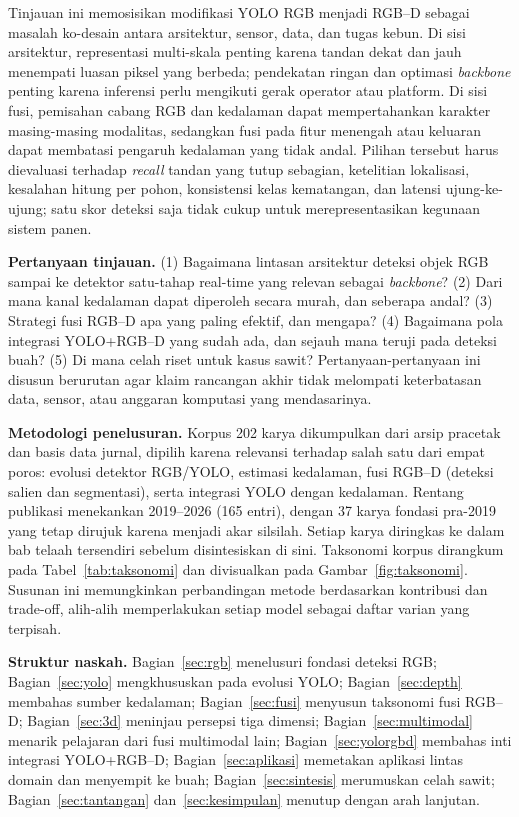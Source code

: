 Tinjauan ini memosisikan modifikasi YOLO RGB menjadi RGB--D sebagai masalah
ko-desain antara arsitektur, sensor, data, dan tugas kebun. Di sisi
arsitektur, representasi multi-skala penting karena tandan dekat dan jauh
menempati luasan piksel yang berbeda; pendekatan ringan dan optimasi
\textit{backbone} penting karena inferensi perlu mengikuti gerak operator
atau platform. Di sisi fusi, pemisahan cabang RGB dan kedalaman dapat
mempertahankan karakter masing-masing modalitas, sedangkan fusi pada fitur
menengah atau keluaran dapat membatasi pengaruh kedalaman yang tidak andal.
Pilihan tersebut harus dievaluasi terhadap \textit{recall} tandan yang
tutup sebagian, ketelitian lokalisasi, kesalahan hitung per pohon, konsistensi
kelas kematangan, dan latensi ujung-ke-ujung; satu skor deteksi saja tidak
cukup untuk merepresentasikan kegunaan sistem panen.

\textbf{Pertanyaan tinjauan.} (1) Bagaimana lintasan arsitektur deteksi
objek RGB sampai ke detektor satu-tahap real-time yang relevan sebagai
\textit{backbone}? (2) Dari mana kanal kedalaman dapat diperoleh secara
murah, dan seberapa andal? (3) Strategi fusi RGB--D apa yang paling
efektif, dan mengapa? (4) Bagaimana pola integrasi YOLO+RGB--D yang
sudah ada, dan sejauh mana teruji pada deteksi buah? (5) Di mana celah
riset untuk kasus sawit? Pertanyaan-pertanyaan ini disusun berurutan agar
klaim rancangan akhir tidak melompati keterbatasan data, sensor, atau
anggaran komputasi yang mendasarinya.

\textbf{Metodologi penelusuran.} Korpus 202 karya dikumpulkan dari
arsip pracetak dan basis data jurnal, dipilih karena relevansi terhadap
salah satu dari empat poros: evolusi detektor RGB/YOLO, estimasi
kedalaman, fusi RGB--D (deteksi salien dan segmentasi), serta integrasi
YOLO dengan kedalaman. Rentang publikasi menekankan 2019--2026 (165
entri), dengan 37 karya fondasi pra-2019 yang tetap dirujuk karena
menjadi akar silsilah. Setiap karya diringkas ke dalam bab telaah
tersendiri sebelum disintesiskan di sini. Taksonomi korpus dirangkum
pada Tabel~\ref{tab:taksonomi} dan divisualkan pada
Gambar~\ref{fig:taksonomi}. Susunan ini memungkinkan perbandingan metode
berdasarkan kontribusi dan trade-off, alih-alih memperlakukan setiap model
sebagai daftar varian yang terpisah.

\textbf{Struktur naskah.} Bagian~\ref{sec:rgb} menelusuri fondasi
deteksi RGB; Bagian~\ref{sec:yolo} mengkhususkan pada evolusi YOLO;
Bagian~\ref{sec:depth} membahas sumber kedalaman; Bagian~\ref{sec:fusi}
menyusun taksonomi fusi RGB--D; Bagian~\ref{sec:3d} meninjau persepsi
tiga dimensi; Bagian~\ref{sec:multimodal} menarik pelajaran dari fusi
multimodal lain; Bagian~\ref{sec:yolorgbd} membahas inti integrasi
YOLO+RGB--D; Bagian~\ref{sec:aplikasi} memetakan aplikasi lintas domain
dan menyempit ke buah; Bagian~\ref{sec:sintesis} merumuskan celah sawit;
Bagian~\ref{sec:tantangan} dan~\ref{sec:kesimpulan} menutup dengan arah
lanjutan.

